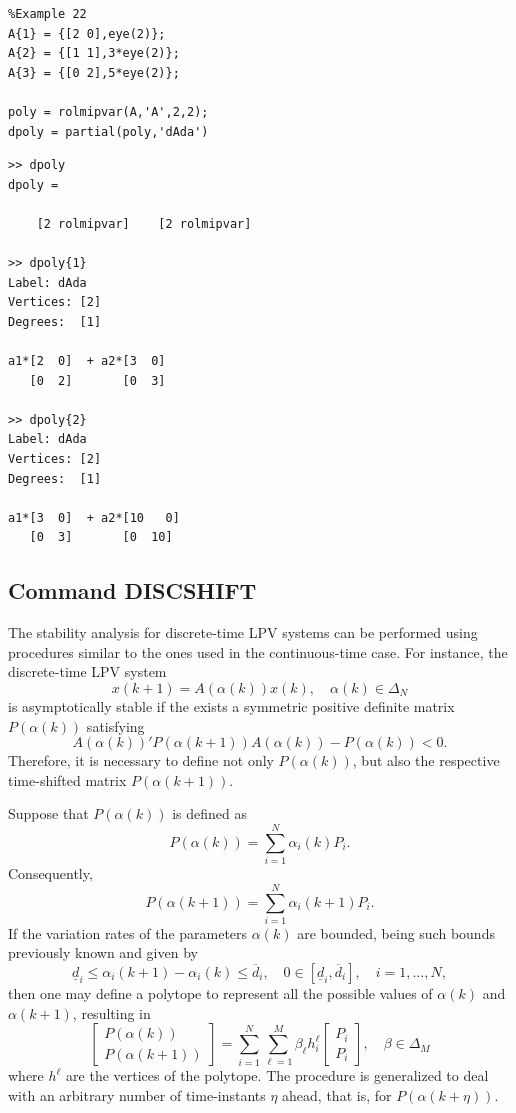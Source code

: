 \documentclass[english,11pt]{article}
\theoremstyle{break} \theorembodyfont{\small\rm}
\begin{document}
\begin{minipage}{7.5cm}
 \begin{lstlisting}
%Example 22
A{1} = {[2 0],eye(2)};
A{2} = {[1 1],3*eye(2)};
A{3} = {[0 2],5*eye(2)};

poly = rolmipvar(A,'A',2,2);
dpoly = partial(poly,'dAda')
 \end{lstlisting}
\end{minipage}
\vspace{0.2cm}

\begin{minipage}{9.2cm}
\begin{lstlisting}[rulecolor=\color{red}]
>> dpoly
dpoly = 

    [2 rolmipvar]    [2 rolmipvar]
    
>> dpoly{1}
Label: dAda
Vertices: [2]
Degrees:  [1]
 
a1*[2  0]  + a2*[3  0] 
   [0  2]       [0  3] 
   
>> dpoly{2}
Label: dAda
Vertices: [2]
Degrees:  [1]
 
a1*[3  0]  + a2*[10   0] 
   [0  3]       [0  10] 
\end{lstlisting}
\end{minipage}
\vspace{0.2cm}


\subsection*{Command DISCSHIFT}

The stability analysis for discrete-time LPV systems can be performed using procedures similar to the ones used in the
continuous-time case. For instance, the discrete-time LPV system
\[
 x(k+1) = A(\alpha(k))x(k), \quad \alpha(k) \in \Delta_N
\]
is asymptotically stable if the exists a symmetric positive definite matrix $P(\alpha(k))$ satisfying
\[
 A(\alpha(k))'P(\alpha(k+1))A(\alpha(k)) - P(\alpha(k)) < 0.
\]
Therefore, it is necessary to define not only $P(\alpha(k))$, but also
the respective time-shifted matrix $P(\alpha(k+1))$.

Suppose that $P(\alpha(k))$ is defined as
\[
 P(\alpha(k)) = \sum_{i=1}^N \alpha_i(k) P_i.
\]
Consequently, 
\[
 P(\alpha(k+1)) = \sum_{i=1}^N \alpha_i(k+1) P_i.
\]
If the variation rates of the parameters $\alpha(k)$ are bounded, being such bounds previously known and given by
\[
 \underline{d}_i \leq \alpha_i(k+1) - \alpha_i(k) \leq \overline{d}_i, \quad 0 \in [\underline{d}_i, \overline{d}_i], \quad i = 1, \ldots, N,
\]
then one may define a polytope to represent all the possible values of $\alpha(k)$ and $\alpha(k+1)$,
resulting in
\[
 \begin{bmatrix}
  P(\alpha(k)) \\ P(\alpha(k+1))
 \end{bmatrix}
 = \sum_{i=1}^N \sum_{\ell=1}^M \beta_\ell h^{\ell}_i
 \begin{bmatrix}
  P_i \\ P_i
 \end{bmatrix}, \quad \beta \in \Delta_M
\]
where $h^\ell$ are the vertices of the polytope. The procedure is generalized to deal with an arbitrary number of time-instants $\eta$ ahead, that is, for $P(\alpha(k+\eta))$.
\end{document}
